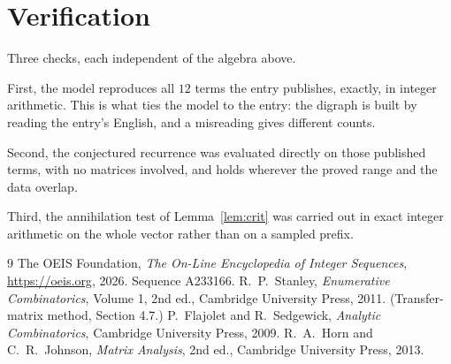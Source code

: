 \documentclass[11pt,a4paper]{article}
\theoremstyle{plain}
\theoremstyle{definition}
\begin{document}
\section{Verification}

Three checks, each independent of the algebra above.

First, the model reproduces all $12$ terms the entry publishes, exactly, in integer
arithmetic. This is what ties the model to the entry: the digraph is built by reading the
entry's English, and a misreading gives different counts.

Second, the conjectured recurrence was evaluated directly on those published terms, with no
matrices involved, and holds wherever the proved range and the data overlap.

Third, the annihilation test of Lemma~\ref{lem:crit} was carried out in exact integer
arithmetic on the whole vector rather than on a sampled prefix.

\begin{thebibliography}{9}
 The OEIS Foundation, \emph{The On-Line Encyclopedia of Integer
Sequences}, \url{https://oeis.org}, 2026. Sequence A233166.
 R.~P.~Stanley, \emph{Enumerative Combinatorics}, Volume 1, 2nd ed.,
Cambridge University Press, 2011. (Transfer-matrix method, Section 4.7.)
 P.~Flajolet and R.~Sedgewick, \emph{Analytic Combinatorics}, Cambridge
University Press, 2009.
 R.~A.~Horn and C.~R.~Johnson, \emph{Matrix Analysis}, 2nd ed., Cambridge
University Press, 2013.
\end{thebibliography}
\end{document}
